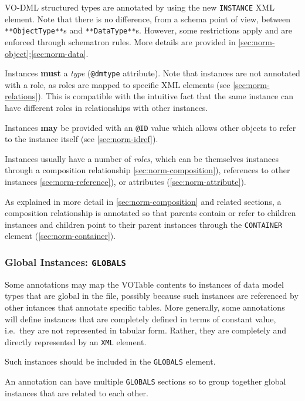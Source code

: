 \documentclass[11pt,a4paper]{ivoa}
\begin{document}
VO-DML structured types are annotated by using the new \texttt{INSTANCE}
XML element. Note that there is no difference, from a schema point of
view, between \texttt{**ObjectType**}s and \texttt{**DataType**}s.
However, some restrictions apply and are enforced through schematron
rules. More details are provided in
\ref{sec:norm-object};\ref{sec:norm-data}.

Instances \textbf{must} a \emph{type} (\texttt{@dmtype} attribute). Note
that instances are not annotated with a role, as roles are mapped to
specific XML elements (see \ref{sec:norm-relations}). This is
compatible with the intuitive fact that the same instance can have
different roles in relationships with other instances.

Instances \textbf{may} be provided with an \texttt{@ID} value which
allows other objects to refer to the instance itself (see
\ref{sec:norm-idref}).

Instances usually have a number of \emph{roles}, which can be themselves
instances through a composition relationship
\ref{sec:norm-composition}), references to other instances
\ref{sec:norm-reference}), or attributes (\ref{sec:norm-attribute}).

As explained in more detail in \ref{sec:norm-composition} and related
sections, a composition relationship is annotated so that parents
contain or refer to children instances and children point to their
parent instances through the \texttt{CONTAINER} element
(\ref{sec:norm-container}).

\subsubsection{Global Instances:
\texttt{GLOBALS}}\label{sec:norm-globals}

Some annotations may map the VOTable contents to instances of data model
types that are global in the file, possibly because such instances are
referenced by other intances that annotate specific tables. More
generally, some annotations will define instances that are completely
defined in terms of constant value, i.e.~they are not represented in
tabular form. Rather, they are completely and directly represented by an
\texttt{XML} element.

Such instances should be included in the \texttt{GLOBALS} element.

An annotation can have multiple \texttt{GLOBALS} sections so to group
together global instances that are related to each other.
\end{document}
